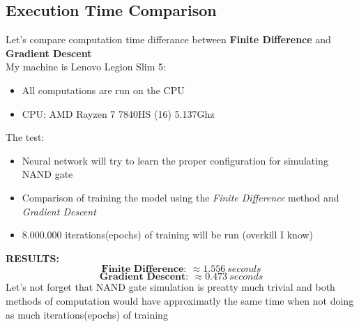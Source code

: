 \documentclass{article}
\begin{document}
\subsection{Execution Time Comparison}
Let's compare computation time differance between \textbf{Finite Difference} and \textbf{Gradient Descent}\\
My machine is Lenovo Legion Slim 5:
\begin{itemize}
    \item {All computations are run on the CPU}
    \item {CPU: AMD Rayzen 7 7840HS (16) 5.137Ghz}
\end{itemize}
The test:
\begin{itemize}
    \item {Neural network will try to learn the proper configuration for simulating NAND gate} 
    \item {Comparison of training the model using the \textit{Finite Difference} method and \textit{Gradient Descent}} 
    \item {8.000.000 iterations(epochs) of training will be run (overkill I know)} 
\end{itemize}
\textbf{RESULTS:}\\
\indent \[ \textbf{Finite Difference}:\ \approx 1.556\ seconds \]
\indent \[ \textbf{Gradient Descent}:\ \approx 0.473\ seconds \]
Let's not forget that NAND gate simulation is preatty much trivial and both methods of computation would have approximatly the same time when not doing as much iterations(epochs) of training \\
\end{document}
